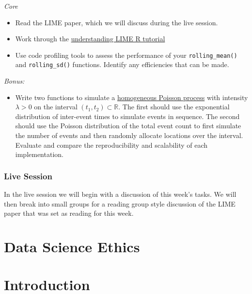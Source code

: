 \documentclass[
  letterpaper,
  DIV=11,
  numbers=noendperiod]{scrreprt}
\providecommand{\tightlist}{%
  \setlength{\itemsep}{0pt}\setlength{\parskip}{0pt}}\usepackage{longtable,booktabs,array}
\begin{document}
\emph{Core}

\begin{itemize}
\item
  Read the LIME paper, which we will discuss during the live session.
\item
  Work through the
  \href{https://cran.r-project.org/web/packages/lime/vignettes/Understanding_lime.html}{understanding
  LIME R tutorial}
\item
  Use code profiling tools to assess the performance of your
  \texttt{rolling\_mean()} and \texttt{rolling\_sd()} functions.
  Identify any efficiencies that can be made.
\end{itemize}

\emph{Bonus:}

\begin{itemize}
\tightlist
\item
  Write two functions to simulate a
  \href{https://en.wikipedia.org/wiki/Poisson_point_process\#Homogeneous_case_2}{homogeneous
  Poisson process} with intensity \(\lambda >0\) on the interval
  \((t_1, t_2) \subset \mathbb{R}\). The first should use the
  exponential distribution of inter-event times to simulate events in
  sequence. The second should use the Poisson distribution of the total
  event count to first simulate the number of events and then randomly
  allocate locations over the interval. Evaluate and compare the
  reproducibility and scalability of each implementation.
\end{itemize}

\section*{Live Session}\label{live-session-3}


In the live session we will begin with a discussion of this week's
tasks. We will then break into small groups for a reading group style
discussion of the LIME paper that was set as reading for this week.

\part{Data Science Ethics}

\part{Introduction}
\end{document}
